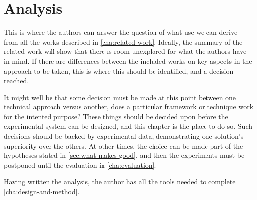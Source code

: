 \chapter{Analysis}
\label{cha:analysis}

This is where the authors can answer the question of what use we can
derive from all the works described in
\autoref{cha:related-work}. Ideally, the summary of the related work
will show that there is room unexplored for what the authors have in
mind. If there are differences between the included works on key
aspects in the approach to be taken, this is where this should be
identified, and a decision reached.

It might well be that some decision must be made at this point between
one technical approach versus another, \eg does a particular framework
or technique work for the intented purpose?  These things should be
decided upon before the experimental system can be designed, and this
chapter is the place to do so. Such decisions should be backed by
experimental data, demonstrating one solution's superiority over the
others. At other times, the choice can be made part of the hypotheses
stated in \autoref{sec:what-makes-good}, and then the experiments must
be postponed until the evaluation in \autoref{cha:evaluation}.

Having written the analysis, the author has all the tools needed to
complete \autoref{cha:design-and-method}.



